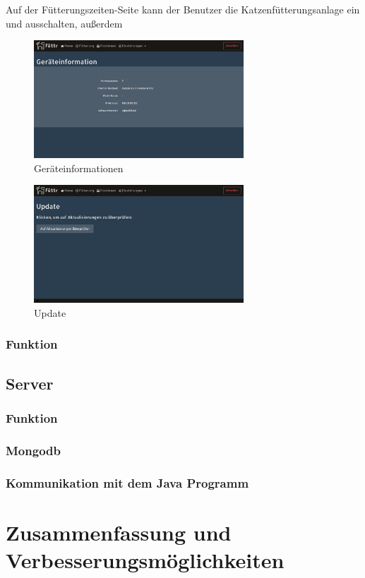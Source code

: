 Auf der Fütterungszeiten-Seite kann der Benutzer die Katzenfütterungsanlage ein und ausschalten, außerdem

\begin{figure}
\vspace{-30pt}
  \begin{center}
    \includegraphics[width=0.7\textwidth]{Bilder/Greistorfer/Gerateinformation.png}
  \end{center}
  \caption{Geräteinformationen}
  \label{Geräteinformationen}
  \vspace{-10pt}
\end{figure}

\begin{figure}
\vspace{-30pt}
  \begin{center}
    \includegraphics[width=0.7\textwidth]{Bilder/Greistorfer/Update.png}
  \end{center}
  \caption{Update}
  \label{Update}
  \vspace{-10pt}
\end{figure}

\subsubsection{Funktion}

\subsection{Server}

\subsubsection{Funktion}

\subsubsection{Mongodb}

\subsubsection{Kommunikation mit dem Java Programm}

\section{Zusammenfassung und Verbesserungsmöglichkeiten}